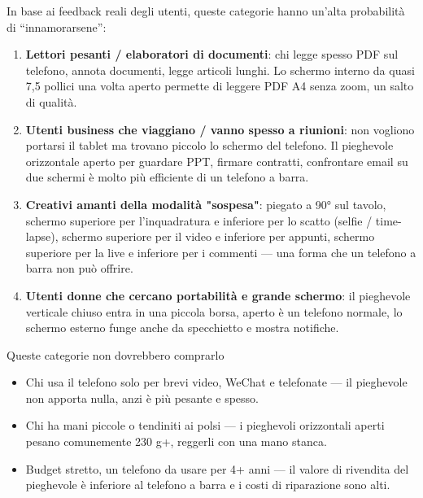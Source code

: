 
In base ai feedback reali degli utenti, queste categorie hanno un'alta probabilità di “innamorarsene”:

\begin{enumerate}
  \item \textbf{Lettori pesanti / elaboratori di documenti}: chi legge spesso PDF sul telefono, annota documenti, legge articoli lunghi. Lo schermo interno da quasi 7,5 pollici una volta aperto permette di leggere PDF A4 senza zoom, un salto di qualità.
  \item \textbf{Utenti business che viaggiano / vanno spesso a riunioni}: non vogliono portarsi il tablet ma trovano piccolo lo schermo del telefono. Il pieghevole orizzontale aperto per guardare PPT, firmare contratti, confrontare email su due schermi è molto più efficiente di un telefono a barra.
  \item \textbf{Creativi amanti della modalità "sospesa"}: piegato a 90° sul tavolo, schermo superiore per l'inquadratura e inferiore per lo scatto (selfie / time-lapse), schermo superiore per il video e inferiore per appunti, schermo superiore per la live e inferiore per i commenti — una forma che un telefono a barra non può offrire.
  \item \textbf{Utenti donne che cercano portabilità e grande schermo}: il pieghevole verticale chiuso entra in una piccola borsa, aperto è un telefono normale, lo schermo esterno funge anche da specchietto e mostra notifiche.
\end{enumerate}

\begin{tcbwarn}{Queste categorie non dovrebbero comprarlo}
\begin{itemize}
  \item Chi usa il telefono solo per brevi video, WeChat e telefonate — il pieghevole non apporta nulla, anzi è più pesante e spesso.
  \item Chi ha mani piccole o tendiniti ai polsi — i pieghevoli orizzontali aperti pesano comunemente 230 g+, reggerli con una mano stanca.
  \item Budget stretto, un telefono da usare per 4+ anni — il valore di rivendita del pieghevole è inferiore al telefono a barra e i costi di riparazione sono alti.
\end{itemize}

\end{tcbwarn}


